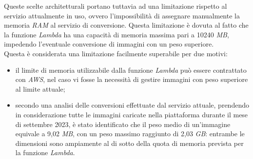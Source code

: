 Queste scelte architetturali portano tuttavia ad una limitazione rispetto al servizio
attualmente in uso, ovvero l'impossibilità di assegnare manualmente la memoria
\emph{RAM} al servizio di conversione. Questa limitazione è dovuta al fatto che
la funzione \emph{Lambda} ha una capacità di memoria massima pari a 10240
\emph{MB}, impedendo l'eventuale conversione di immagini con un peso
superiore.\\
Questa è considerata una limitazione facilmente superabile per due motivi:
\begin{itemize}
      \item il limite di memoria utilizzabile dalla funzione \emph{Lambda} può essere
            contrattato con \emph{AWS}, nel caso vi fosse la necessità di gestire immagini
            con peso superiore al limite attuale;
      \item secondo una analisi delle conversioni effettuate dal servizio attuale,
            prendendo in considerazione tutte le immagini caricate nella piattaforma
            durante il mese di settembre 2023, è stato identificato che il peso medio di
            un'immagine equivale a 9,02 \emph{MB}, con un peso massimo raggiunto di 2,03
            \emph{GB}: entrambe le dimensioni sono ampiamente al di sotto della quota di
            memoria prevista per la funzione \emph{Lambda}.
\end{itemize}


